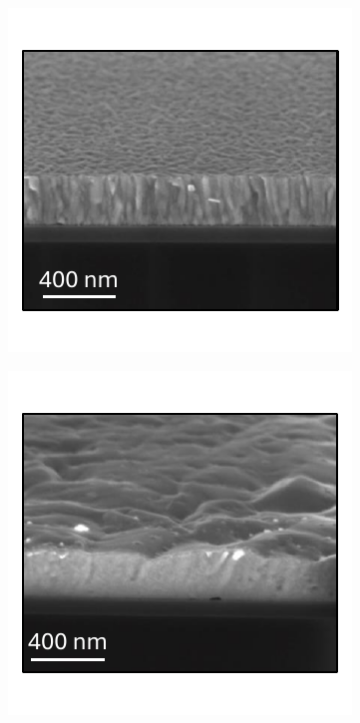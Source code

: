 \begin{figure}[htbp]
    \vspace{1em} %

    \begin{subfigure}[t]{0.4\textwidth}
        \centering
        \includegraphics[width=\textwidth]{chapters/material_properties/images/SEM_Before.pdf} 
        \caption{}
        \label{fig:ch2:sem_before}
    \end{subfigure}
    \hfill
    \begin{subfigure}[t]{0.4\textwidth}
        \centering
        \includegraphics[width=\textwidth]{chapters/material_properties/images/SEM_After.pdf} 

\end{subfigure}
\end{figure}
